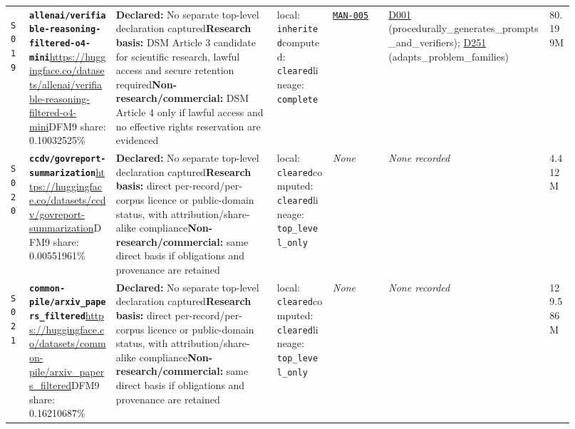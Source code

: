 \documentclass[9pt,a4paper]{article}
\newcommand{\srcid}[1]{\hypertarget{src:#1}{\texttt{#1}}}
\begin{document}
\begin{landscape}
\begin{longtable}{@{}L{0.03\linewidth}L{0.14\linewidth}L{0.26\linewidth}L{0.09\linewidth}L{0.09\linewidth}L{0.265\linewidth}L{0.045\linewidth}@{}}
\srcid{S019} & \textbf{\nolinkurl{allenai/verifiable-reasoning-filtered-o4-mini}}\newline \url{https://huggingface.co/datasets/allenai/verifiable-reasoning-filtered-o4-mini}\newline DFM9 share: 0.10032525\% & \textbf{Declared:} No separate top-level declaration captured\newline \textbf{Research basis:} DSM Article 3 candidate for scientific research, lawful access and secure retention required\newline \textbf{Non-research/commercial:} DSM Article 4 only if lawful access and no effective rights reservation are evidenced & local: \texttt{inherited}\newline computed: \texttt{cleared}\newline lineage: \texttt{complete} & \hyperlink{manual:MAN-005}{\texttt{MAN-005}} & \hyperlink{dep:D001}{D001} (procedurally\_generates\_prompts\_and\_verifiers); \hyperlink{dep:D251}{D251} (adapts\_problem\_families) & 80.199M \\
\srcid{S020} & \textbf{\nolinkurl{ccdv/govreport-summarization}}\newline \url{https://huggingface.co/datasets/ccdv/govreport-summarization}\newline DFM9 share: 0.00551961\% & \textbf{Declared:} No separate top-level declaration captured\newline \textbf{Research basis:} direct per-record/per-corpus licence or public-domain status, with attribution/share-alike compliance\newline \textbf{Non-research/commercial:} same direct basis if obligations and provenance are retained & local: \texttt{cleared}\newline computed: \texttt{cleared}\newline lineage: \texttt{top\_level\_only} & \textit{None} & \textit{None recorded} & 4.412M \\
\srcid{S021} & \textbf{\nolinkurl{common-pile/arxiv_papers_filtered}}\newline \url{https://huggingface.co/datasets/common-pile/arxiv_papers_filtered}\newline DFM9 share: 0.16210687\% & \textbf{Declared:} No separate top-level declaration captured\newline \textbf{Research basis:} direct per-record/per-corpus licence or public-domain status, with attribution/share-alike compliance\newline \textbf{Non-research/commercial:} same direct basis if obligations and provenance are retained & local: \texttt{cleared}\newline computed: \texttt{cleared}\newline lineage: \texttt{top\_level\_only} & \textit{None} & \textit{None recorded} & 129.586M \\

\end{longtable}
\end{landscape}
\end{document}
